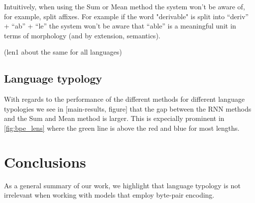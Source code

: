 \documentclass[11pt]{article}
\newcommand\jp[1]{(\textbf{JP:} #1)}
\begin{document}
              Intuitively, when using the Sum or Mean method the
     system won't be aware of, for example, split affixes. For example
     if the word "derivable" is split into ``deriv'' + ``ab'' + ``le''
     the system won't be aware that ``able'' is a meaningful unit in
     terms of morphology (and by extension, semantics).

        
    (len1 about the same for all languages)

    \subsection{Language typology}
    With regards to the performance of the different methods for
     different language typologies we see in [main-results, figure]
     that the gap between the RNN methods and the Sum and Mean method
     is larger. This is expecially prominent in \cref{fig:bpe_lens}
     where the green line is above the red and blue for most lengths.

    

    
    \section{Conclusions}
    	As a general summary of our work, we highlight that language typology is not irrelevant when working with models that employ byte-pair encoding.
	
	
	
	
	
	
\end{document}
